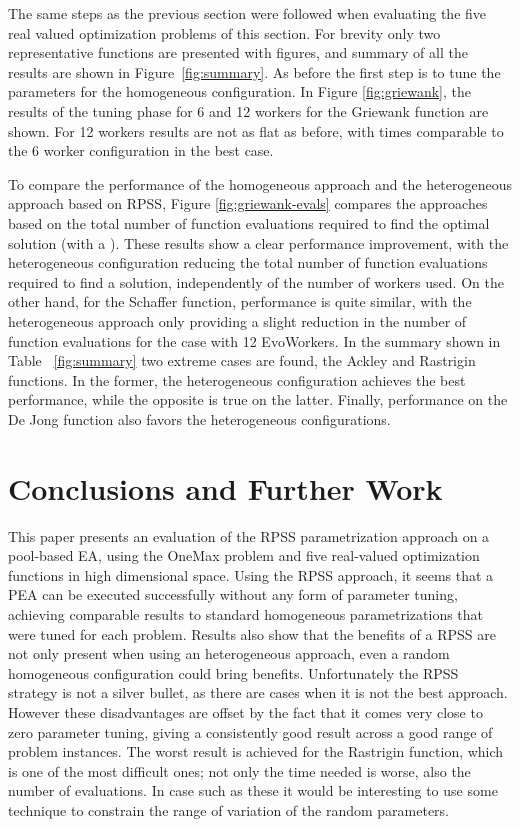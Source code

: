\documentclass[conference]{IEEEtran}
\begin{document}
The same steps as the previous section were followed when evaluating the five real valued
optimization problems of this section.  For brevity only two representative functions are
presented with figures, and summary of all the results are shown in Figure~\ref{fig:summary}. As before
the first step is to tune the parameters for the homogeneous configuration.
In Figure \ref{fig:griewank}, the results of the tuning phase for 6 and 12 workers
for the Griewank function are shown. For 12 workers results are not as flat as before,
with times comparable to the 6 worker configuration in the best case.

To compare the performance of the homogeneous approach and the heterogeneous approach based on RPSS,
Figure \ref{fig:griewank-evals} compares the approaches based on the total number of function
evaluations required to find the optimal solution (with a ).
These results show a clear performance improvement, with the heterogeneous configuration
reducing the total number of function evaluations required to find a solution,
independently of the number of workers used.
On the other hand, for the Schaffer function, performance is quite similar,
with the heterogeneous approach only providing a slight reduction in the number
of function evaluations for the case with 12 EvoWorkers.
In the summary shown in Table ~\ref{fig:summary} two extreme cases are found, the Ackley and Rastrigin functions.
In the former, the heterogeneous configuration achieves the best performance, while the opposite is true on the latter.
Finally, performance on the De Jong function also favors the heterogeneous configurations.

\section{Conclusions and Further Work}
\label{sec:conclusions}
This paper presents an evaluation of the RPSS parametrization approach on
a pool-based EA, using the OneMax problem and five real-valued optimization functions
in high dimensional space.
Using the RPSS approach, it seems that a PEA can be executed successfully
without any form of parameter tuning, achieving comparable results to standard homogeneous
parametrizations that were tuned for each problem.
Results also show that the benefits of a RPSS are not only present
when using an heterogeneous approach, even a random homogeneous configuration could bring
benefits. Unfortunately the RPSS strategy is not a silver bullet, as there are cases
when it is not the best approach. However these disadvantages are
offset by the fact that it comes very close to zero parameter tuning,
giving a consistently good result across a good range of problem instances.
The worst result is achieved for the Rastrigin function, which
is one of the most difficult ones; not only the time needed is worse,
also the number of evaluations. In case such as these it would be
interesting to use some technique to constrain the range of variation
of the random parameters.
\end{document}
